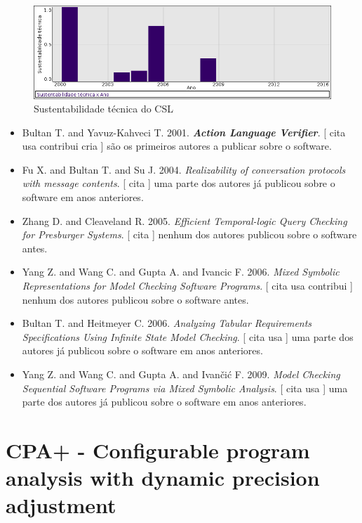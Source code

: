 \begin{figure}[h]
  \center
  \includegraphics[scale=0.50]{imagens/softwares-charts/composite.png}
  \caption{Sustentabilidade técnica do CSL}
\end{figure}


\begin{itemize}
\item Bultan T. and Yavuz-Kahveci T.
      2001.
        \textbf{\textit{ Action Language Verifier}}.
      [
          cita
          usa
          contribui
          cria
      ]
são os primeiros autores a publicar sobre o software.
\item Fu X. and Bultan T. and Su J.
      2004.
        \textit{ Realizability of conversation protocols with message contents}.
      [
          cita
      ]
uma parte dos autores já publicou sobre o software em anos anteriores.
\item Zhang D. and Cleaveland R.
      2005.
        \textit{ Efficient Temporal-logic Query Checking for Presburger Systems}.
      [
          cita
      ]
nenhum dos autores publicou sobre o software antes.
\item Yang Z. and Wang C. and Gupta A. and Ivancic F.
      2006.
        \textit{ Mixed Symbolic Representations for Model Checking Software Programs}.
      [
          cita
          usa
          contribui
      ]
nenhum dos autores publicou sobre o software antes.
\item Bultan T. and Heitmeyer C.
      2006.
        \textit{ Analyzing Tabular Requirements Specifications Using Infinite State Model Checking}.
      [
          cita
          usa
      ]
uma parte dos autores já publicou sobre o software em anos anteriores.
\item Yang Z. and Wang C. and Gupta A. and Ivan\v{c}i\'{c} F.
      2009.
        \textit{ Model Checking Sequential Software Programs via Mixed Symbolic Analysis}.
      [
          cita
          usa
      ]
uma parte dos autores já publicou sobre o software em anos anteriores.
\end{itemize}
\section{CPA+ - Configurable program analysis with dynamic precision adjustment}

